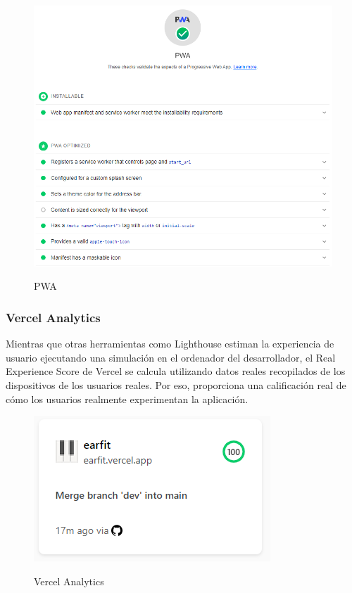\documentclass[12pt,twoside,titlepage]{report}
\begin{document}
\begin{figure}[H]
    \centering
    \includegraphics[scale=0.6]{Lighthouse_PWA}
    \label{fig:Lighthouse_PWA}
    \caption{PWA}
\end{figure}

\subsubsection{Vercel Analytics}

Mientras que otras herramientas como Lighthouse estiman la experiencia de usuario ejecutando una simulación en el ordenador del desarrollador, el Real Experience Score de Vercel se calcula utilizando datos reales recopilados de los dispositivos de los usuarios reales. Por eso, proporciona una calificación real de cómo los usuarios realmente experimentan la aplicación.

\begin{figure}[H]
    \centering
    \includegraphics[scale=0.8]{Vercel_metrics_resume}
    \label{fig:Vercel_metrics_resume}
    \caption{Vercel Analytics}
\end{figure}
\end{document}
